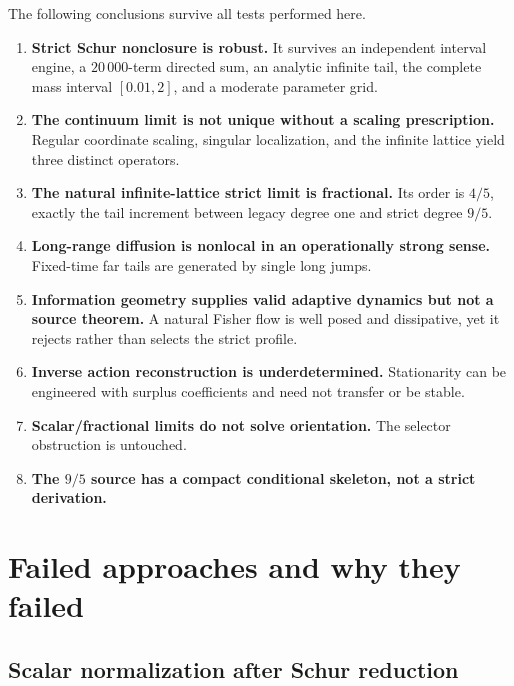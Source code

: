 \documentclass[11pt,a4paper,openany]{report}
\begin{document}
The following conclusions survive all tests performed here.

\begin{enumerate}
\item 
\textbf{Strict Schur nonclosure is robust.} It survives an independent interval engine, a \(20\,000\)-term directed sum, an analytic infinite tail, the complete mass interval \([0.01,2]\), and a moderate parameter grid.

\item 
\textbf{The continuum limit is not unique without a scaling prescription.} Regular coordinate scaling, singular localization, and the infinite lattice yield three distinct operators.

\item 
\textbf{The natural infinite-lattice strict limit is fractional.} Its order is \(4/5\), exactly the tail increment between legacy degree one and strict degree \(9/5\).

\item 
\textbf{Long-range diffusion is nonlocal in an operationally strong sense.} Fixed-time far tails are generated by single long jumps.

\item 
\textbf{Information geometry supplies valid adaptive dynamics but not a source theorem.} A natural Fisher flow is well posed and dissipative, yet it rejects rather than selects the strict profile.

\item 
\textbf{Inverse action reconstruction is underdetermined.} Stationarity can be engineered with surplus coefficients and need not transfer or be stable.

\item 
\textbf{Scalar/\allowbreak{}fractional limits do not solve orientation.} The selector obstruction is untouched.

\item 
\textbf{The \(9/5\) source has a compact conditional skeleton, not a strict derivation.}

\end{enumerate}

\section{Failed approaches and why they failed}

\subsection{Scalar normalization after Schur reduction}
\end{document}
